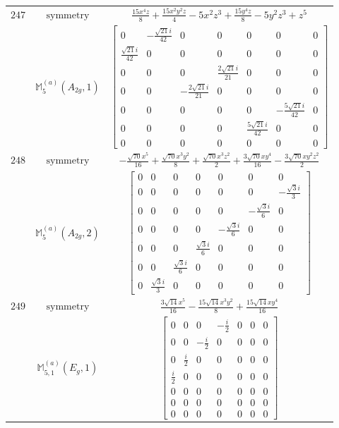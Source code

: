\documentclass[fleqn,8pt,landscape]{jsarticle}
\begin{document}
\begin{longtable}{ccc}
$ 247 $ & $ \text{symmetry} $ & $ \frac{15 x^{4} z}{8} + \frac{15 x^{2} y^{2} z}{4} - 5 x^{2} z^{3} + \frac{15 y^{4} z}{8} - 5 y^{2} z^{3} + z^{5} $ \\
$  $ & $ \mathbb{M}_{5}^{(a)}(A_{2g},1) $ & $ \begin{bmatrix} 0 & - \frac{\sqrt{21} i}{42} & 0 & 0 & 0 & 0 & 0 \\ \frac{\sqrt{21} i}{42} & 0 & 0 & 0 & 0 & 0 & 0 \\ 0 & 0 & 0 & \frac{2 \sqrt{21} i}{21} & 0 & 0 & 0 \\ 0 & 0 & - \frac{2 \sqrt{21} i}{21} & 0 & 0 & 0 & 0 \\ 0 & 0 & 0 & 0 & 0 & - \frac{5 \sqrt{21} i}{42} & 0 \\ 0 & 0 & 0 & 0 & \frac{5 \sqrt{21} i}{42} & 0 & 0 \\ 0 & 0 & 0 & 0 & 0 & 0 & 0 \end{bmatrix} $ \\ \hline
$ 248 $ & $ \text{symmetry} $ & $ - \frac{\sqrt{70} x^{5}}{16} + \frac{\sqrt{70} x^{3} y^{2}}{8} + \frac{\sqrt{70} x^{3} z^{2}}{2} + \frac{3 \sqrt{70} x y^{4}}{16} - \frac{3 \sqrt{70} x y^{2} z^{2}}{2} $ \\
$  $ & $ \mathbb{M}_{5}^{(a)}(A_{2g},2) $ & $ \begin{bmatrix} 0 & 0 & 0 & 0 & 0 & 0 & 0 \\ 0 & 0 & 0 & 0 & 0 & 0 & - \frac{\sqrt{3} i}{3} \\ 0 & 0 & 0 & 0 & 0 & - \frac{\sqrt{3} i}{6} & 0 \\ 0 & 0 & 0 & 0 & - \frac{\sqrt{3} i}{6} & 0 & 0 \\ 0 & 0 & 0 & \frac{\sqrt{3} i}{6} & 0 & 0 & 0 \\ 0 & 0 & \frac{\sqrt{3} i}{6} & 0 & 0 & 0 & 0 \\ 0 & \frac{\sqrt{3} i}{3} & 0 & 0 & 0 & 0 & 0 \end{bmatrix} $ \\ \hline
$ 249 $ & $ \text{symmetry} $ & $ \frac{3 \sqrt{14} x^{5}}{16} - \frac{15 \sqrt{14} x^{3} y^{2}}{8} + \frac{15 \sqrt{14} x y^{4}}{16} $ \\
$  $ & $ \mathbb{M}_{5,1}^{(a)}(E_{g},1) $ & $ \begin{bmatrix} 0 & 0 & 0 & - \frac{i}{2} & 0 & 0 & 0 \\ 0 & 0 & - \frac{i}{2} & 0 & 0 & 0 & 0 \\ 0 & \frac{i}{2} & 0 & 0 & 0 & 0 & 0 \\ \frac{i}{2} & 0 & 0 & 0 & 0 & 0 & 0 \\ 0 & 0 & 0 & 0 & 0 & 0 & 0 \\ 0 & 0 & 0 & 0 & 0 & 0 & 0 \\ 0 & 0 & 0 & 0 & 0 & 0 & 0 \end{bmatrix} $ \\ \hline

\end{longtable}
\end{document}
